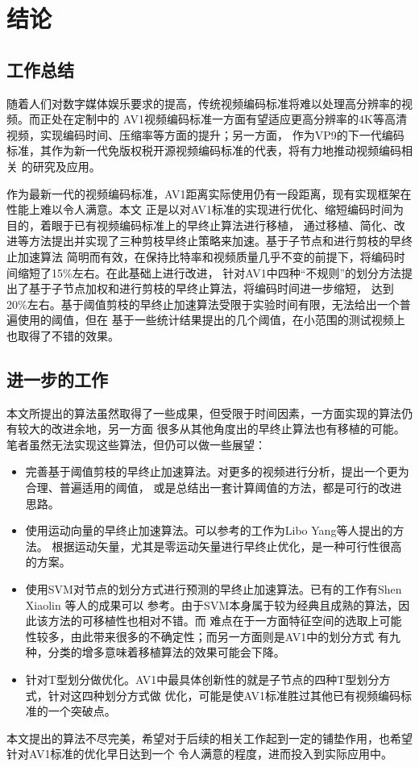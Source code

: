 \chapter{结论}
\label{cha:conclusion}

\section{工作总结}

随着人们对数字媒体娱乐要求的提高，传统视频编码标准将难以处理高分辨率的视频。而正处在定制中的
AV1视频编码标准一方面有望适应更高分辨率的4K等高清视频，实现编码时间、压缩率等方面的提升；另一方面，
作为VP9的下一代编码标准，其作为新一代免版权税开源视频编码标准的代表，将有力地推动视频编码相关
的研究及应用。

作为最新一代的视频编码标准，AV1距离实际使用仍有一段距离，现有实现框架在性能上难以令人满意。本文
正是以对AV1标准的实现进行优化、缩短编码时间为目的，着眼于已有视频编码标准上的早终止算法进行移植，
通过移植、简化、改进等方法提出并实现了三种剪枝早终止策略来加速。基于子节点和进行剪枝的早终止加速算法
简明而有效，在保持比特率和视频质量几乎不变的前提下，将编码时间缩短了15\%左右。在此基础上进行改进，
针对AV1中四种“不规则”的划分方法提出了基于子节点加权和进行剪枝的早终止算法，将编码时间进一步缩短，
达到20\%左右。基于阈值剪枝的早终止加速算法受限于实验时间有限，无法给出一个普遍使用的阈值，但在
基于一些统计结果提出的几个阈值，在小范围的测试视频上也取得了不错的效果。

\section{进一步的工作}

本文所提出的算法虽然取得了一些成果，但受限于时间因素，一方面实现的算法仍有较大的改进余地，另一方面
很多从其他角度出的早终止算法也有移植的可能。笔者虽然无法实现这些算法，但仍可以做一些展望：

\begin{itemize}
    \item 完善基于阈值剪枝的早终止加速算法。对更多的视频进行分析，提出一个更为合理、普遍适用的阈值，
    或是总结出一套计算阈值的方法，都是可行的改进思路。
    \item 使用运动向量的早终止加速算法。可以参考的工作为Libo Yang等人提出的方法\cite{yang2005effective}。
    根据运动矢量，尤其是零运动矢量进行早终止优化，是一种可行性很高的方案。
    \item 使用SVM对节点的划分方式进行预测的早终止加速算法。已有的工作有Shen Xiaolin 等人的成果可以
    参考\cite{shen2013cu}。由于SVM本身属于较为经典且成熟的算法，因此该方法的可移植性也相对不错。而
    难点在于一方面特征空间的选取上可能性较多，由此带来很多的不确定性；而另一方面则是AV1中的划分方式
    有九种，分类的增多意味着移植算法的效果可能会下降。
    \item 针对T型划分做优化。AV1中最具体创新性的就是子节点的四种T型划分方式，针对这四种划分方式做
    优化，可能是使AV1标准胜过其他已有视频编码标准的一个突破点。
\end{itemize}

本文提出的算法不尽完美，希望对于后续的相关工作起到一定的铺垫作用，也希望针对AV1标准的优化早日达到一个
令人满意的程度，进而投入到实际应用中。
